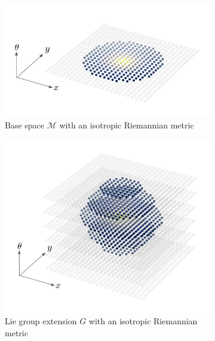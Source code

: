 \documentclass{article}
\begin{document}
\begin{figure}[h!]
    \centering
    \begin{subfigure}[b]{0.3\textwidth}
        \centering
        \includegraphics[width=\textwidth]{Images/r2_isotropic_diffusion.png}
        \caption{Base space $\mathcal{M}$ with an isotropic Riemannian metric}
    \end{subfigure}
    \hfill
    \begin{subfigure}[b]{0.3\textwidth}
        \centering
        \includegraphics[width=\textwidth]{Images/se2_isotropic_diffusion.png}
        \caption{Lie group extension $G$ with an isotropic Riemannian metric}
    \end{subfigure}
    \hfill
    \begin{subfigure}[b]{0.3\textwidth}
        \centering

\end{subfigure}
\end{figure}
\end{document}
